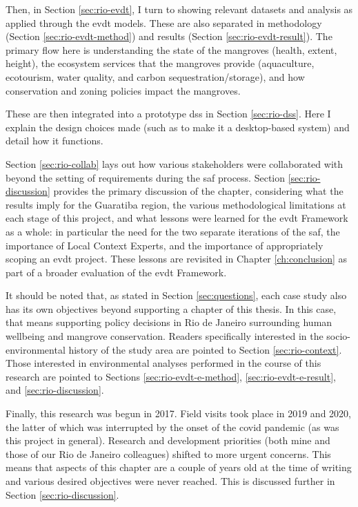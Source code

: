 Then, in Section \ref{sec:rio-evdt}, I turn to showing relevant datasets and analysis as applied through the \ac{evdt} models. These are also separated in methodology (Section \ref{sec:rio-evdt-method}) and results (Section \ref{sec:rio-evdt-result}). The primary flow here is understanding the state of the mangroves (health, extent, height), the ecosystem services that the mangroves provide (aquaculture, ecotourism, water quality, and carbon sequestration/storage), and how conservation and zoning policies impact the mangroves. 

These are then integrated into a prototype \ac{dss} in Section \ref{sec:rio-dss}. Here I explain the design choices made (such as to make it a desktop-based system) and detail how it functions. 

Section \ref{sec:rio-collab} lays out how various stakeholders were collaborated with beyond the setting of requirements during the \ac{saf} process. Section \ref{sec:rio-discussion} provides the primary discussion of the chapter, considering what the results imply for the Guaratiba region, the various methodological limitations at each stage of this project, and what lessons were learned for the \ac{evdt} Framework as a whole: in particular the need for the two separate iterations of the \ac{saf}, the importance of Local Context Experts, and the importance of appropriately scoping an \ac{evdt} project. These lessons are revisited in Chapter \ref{ch:conclusion} as part of a broader evaluation of the \ac{evdt} Framework.

It should be noted that, as stated in Section \ref{sec:questions}, each case study also has its own objectives beyond supporting a chapter of this thesis. In this case, that means supporting policy decisions in Rio de Janeiro surrounding human wellbeing and mangrove conservation. Readers specifically interested in the socio-environmental history of the study area are pointed to Section \ref{sec:rio-context}. Those interested in environmental analyses performed in the course of this research are pointed to Sections \ref{sec:rio-evdt-e-method}, \ref{sec:rio-evdt-e-result}, and \ref{sec:rio-discussion}.

Finally, this research was begun in 2017. Field visits took place in 2019 and 2020, the latter of which was interrupted by the onset of the \ac{covid} pandemic (as was this project in general). Research and development priorities (both mine and those of our Rio de Janeiro colleagues) shifted to more urgent concerns. This means that aspects of this chapter are a couple of years old at the time of writing and various desired objectives were never reached. This is discussed further in Section \ref{sec:rio-discussion}.

